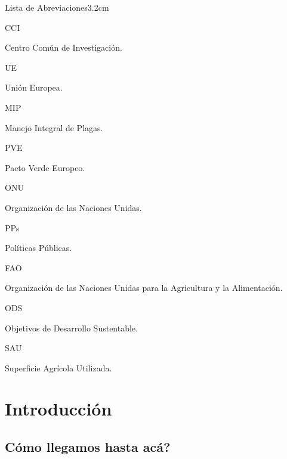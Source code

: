 \documentclass[a4paper, nobind]{templates/ociamthesis}
\begin{document}
\begin{romanpages}
\begin{mclistof}{Lista de Abreviaciones}{3.2cm}
\item[CCI]

Centro Común de Investigación.

\item[UE]

Unión Europea.

\item[MIP]

Manejo Integral de Plagas.

\item[PVE]

Pacto Verde Europeo.

\item[ONU]

Organización de las Naciones Unidas.

\item[PPs]

Políticas Públicas.

\item[FAO]

Organización de las Naciones Unidas para la Agricultura y la Alimentación.

\item[ODS]

Objetivos de Desarrollo Sustentable.

\item[SAU]

Superficie Agrícola Utilizada.

\end{mclistof} 


\end{romanpages}

\flushbottom

\renewcommand\tablename{Tabla}
\renewcommand\figurename{Figura}
\renewcommand{\appendixtocname}{Anexos}
\renewcommand{\appendixpagename}{Anexos}

\sloppy
\hypertarget{introduccion}{%
\chapter{Introducción}\label{introduccion}}

\minitoc

\hypertarget{como_llegamos}{%
\section{\texorpdfstring{\textquestiondown Cómo llegamos hasta acá?}{Cómo llegamos hasta acá?}}\label{como_llegamos}}
\end{document}
